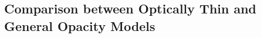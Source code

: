 
\subsection{Comparison between Optically Thin and General Opacity Models}
\label{sec:comparison_optically_thin_and_general_opacity}

